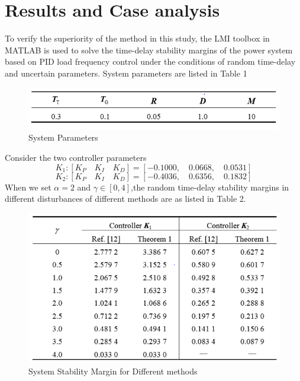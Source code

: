 \documentclass[journal]{IEEEtran}
\begin{document}
\section{Results and Case analysis}
To verify the superiority of the method in this study, the LMI toolbox in MATLAB is used to solve the time-delay stability margins of the power system based on PID load frequency control under the conditions of random time-delay and uncertain parameters. System parameters are listed in Table 1
\begin{figure}[h!]
\includegraphics[width=\linewidth]{systemparameters.png}
  \caption{System Parameters}
  \label{Table1: System Parameters}
\end{figure}
Consider the two controller parameters \\
\begin{equation}
K_1 : [K_P \quad K_I \quad K_D]  = [-0.100 0,\quad 0.066 8, \quad 0.053 1]
\end{equation}
\begin{equation}
K_2 : [K_P \quad K_I \quad K_D]  = [-0.403 6,\quad 0.635 6, \quad 0.183 2]
\end{equation}
When we set $\alpha =2 $ and $\gamma \in [0,4]$,the random time-delay stability margins in different disturbances of different methods are as listed in Table 2. 
\begin{figure}[h!]
\includegraphics[width=\linewidth]{stabilitymargin.png}
  \caption{System Stability Margin for Different methods}
  \label{Table2: System Stability margin for different methods}
\end{figure}
\end{document}
